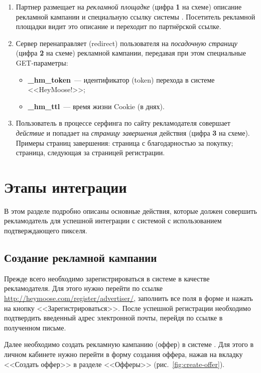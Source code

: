 \documentclass[a4paper,12pt]{article}
\begin{document}
\begin{enumerate}
\item Партнер размещает на \textit{рекламной площадке} (цифра \textbf{1} на схеме) описание рекламной кампании и специальную ссылку системы \heymoose. Посетитель рекламной площадки видит это описание и переходит по партнёрской ссылке.
\item Сервер \heymoose{} перенаправляет (redirect) пользователя на \textit{посадочную страницу} (цифра \textbf{2} на схеме) рекламной кампании, передавая при этом специальные GET-параметры:
	\begin{itemize}
	\item \textbf{\_hm\_token}~--- идентификатор (token) перехода в системе <<HeyMoose!>>;
	\item \textbf{\_hm\_ttl}~--- время жизни Cookie (в днях).
	\end{itemize}
\item Пользователь в процессе серфинга по сайту рекламодателя совершает \textit{действие} и попадает на \textit{страницу завершения} действия (цифра \textbf{3} на схеме). Примеры страниц завершения: страница с благодарностью за покупку; страница, следующая за страницей регистрации.
\end{enumerate}

\section{Этапы интеграции}

В этом разделе подробно описаны основные действия, которые должен совершить рекламодатель для успешной интеграции с системой \heymoose{} с использованием подтверждающего пикселя.

\subsection{Создание рекламной кампании}

Прежде всего необходимо зарегистрироваться в системе \heymoose{} в качестве рекламодателя. Для этого нужно перейти по ссылке \href{http://heymoose.com/register/advertiser/}{http://heymoose.com/register/advertiser/}, заполнить все поля в форме и нажать на кнопку <<Зарегистрироваться>>. После успешной регистрации необходимо подтвердить введенный адрес электронной почты, перейдя по ссылке в полученном письме.

Далее необходимо создать рекламную кампанию (оффер) в системе \heymoose. Для этого в личном кабинете нужно перейти в форму создания оффера, нажав на вкладку <<Создать оффер>> в разделе <<Офферы>> (рис.~\ref{fig:create-offer}).
\end{document}
